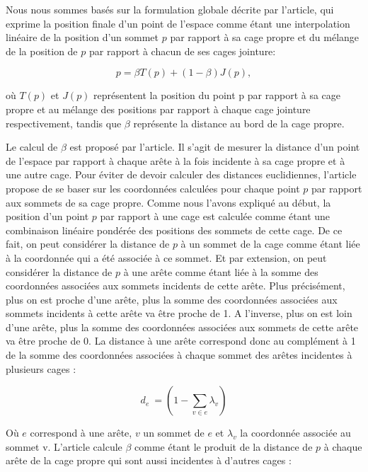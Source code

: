 Nous nous sommes basés sur la formulation globale décrite par
l'article, qui exprime la position finale d'un point de l'espace comme
étant une interpolation linéaire de la position d'un sommet $p$ par
rapport à sa cage propre et du mélange de la position de $p$ par
rapport à chacun de ses cages jointure:

\begin{equation}
  p = \beta T(p)  + (1 - \beta) J(p),
  \label{MELgen}
\end{equation}

où $T(p)$ et $J(p)$ représentent la position du point p par rapport à
sa cage propre et au mélange des positions par rapport à chaque cage
jointure respectivement, tandis que $\beta$ représente la distance au
bord de la cage propre.

Le calcul de $\beta$ est proposé par l'article. Il s'agit de mesurer
la distance d'un point de l'espace par rapport à chaque arête à la
fois incidente à sa cage propre et à une autre cage. Pour éviter de
devoir calculer des distances euclidiennes, l'article propose de se
baser sur les coordonnées calculées pour chaque point $p$ par rapport
aux sommets de sa cage propre. Comme nous l'avons expliqué au début,
la position d'un point $p$ par rapport à une cage est calculée comme
étant une combinaison linéaire pondérée des positions des sommets de
cette cage. De ce fait, on peut considérer la distance de $p$ à un
sommet de la cage comme étant liée à la coordonnée qui a été associée
à ce sommet. Et par extension, on peut considérer la distance de $p$ à
une arête comme étant liée à la somme des coordonnées associées aux
sommets incidents de cette arête. Plus précisément, plus on est proche
d'une arête, plus la somme des coordonnées associées aux sommets
incidents à cette arête va être proche de 1. A l'inverse, plus on est
loin d'une arête, plus la somme des coordonnées associées aux sommets
de cette arête va être proche de 0. La distance à une arête correspond
donc au complément à 1 de la somme des coordonnées associées à chaque
sommet des arêtes incidentes à plusieurs cages :

\begin{equation}
  d_e~ = (1 - \sum_{v \in e} \lambda_v)
\end{equation}

Où $e$ correspond à une arête, $v$ un sommet de $e$ et $\lambda_v$ la
coordonnée associée au sommet v. L'article calcule $\beta$ comme étant
le produit de la distance de $p$ à chaque arête de la cage propre qui
sont aussi incidentes à d'autres cages :

